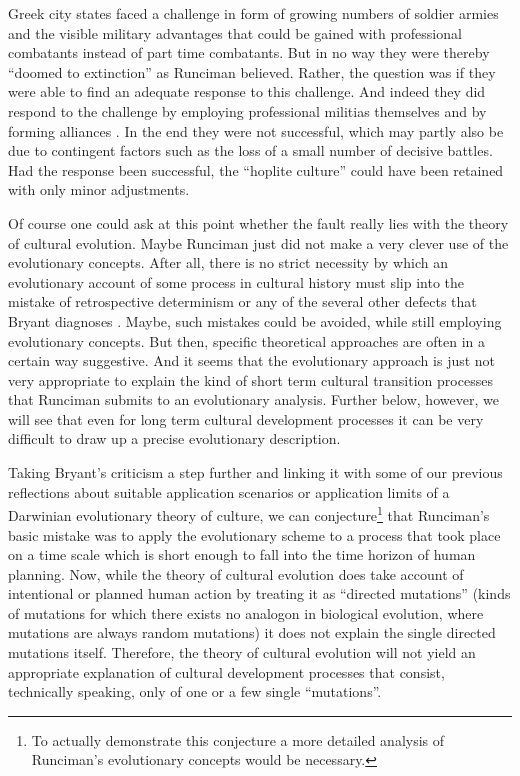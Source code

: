 Greek city states faced a challenge in form of growing numbers of
soldier armies and the visible military advantages that could be
gained with professional combatants instead of part time combatants. But
in no way they were thereby ``doomed to extinction'' as Runciman
believed.  Rather, the question was if they were able to find an
adequate response to this challenge.  And indeed they did respond to
the challenge by employing professional militias themselves and by
forming alliances \cite[p.\ 480]{bryant:2004}. In the end they were not
successful, which may partly also be due to contingent factors such as the loss
of a small number of decisive battles. Had the response been
successful, the ``hoplite culture'' could have been retained with only
minor adjustments.

Of course one could ask at this point whether the fault really lies
with the theory of cultural evolution. Maybe Runciman just did not
make a very clever use of the evolutionary concepts. After all, there
is no strict necessity by which an evolutionary account of some process in
cultural history must slip into the mistake of retrospective
determinism or any of the several other defects that Bryant diagnoses
\cite[p.\ 481]{bryant:2004}. Maybe, such mistakes could be avoided,
while still employing evolutionary concepts. But then, specific
theoretical approaches are often in a certain way suggestive. And it
seems that the evolutionary approach is just not very appropriate to
explain the kind of short term cultural transition processes 
that Runciman submits to an evolutionary analysis. Further below,
however, we will see that even for long term cultural development
processes it can be very difficult to draw up a precise evolutionary
description.

Taking Bryant's criticism a step further and linking it with some of our
previous reflections about suitable application scenarios or application
limits of a Darwinian evolutionary theory of culture, we can
conjecture\footnote{To actually demonstrate this conjecture a more detailed
  analysis of Runciman's evolutionary concepts would be necessary.} that
Runciman's basic mistake was to apply the evolutionary scheme to a process
that took place on a time scale which is short enough to fall into the time
horizon of human planning. Now, while the theory of cultural evolution does
take account of intentional or planned human action by treating it as ``directed
mutations'' (kinds of mutations for which there exists no analogon in
biological evolution, where mutations are always random mutations) it does not
explain the single directed mutations itself. Therefore, the theory of
cultural evolution will not yield an appropriate explanation of cultural
development processes that consist, technically speaking, only of one or a few
single ``mutations''.

